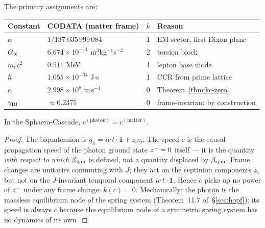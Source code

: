\begin{theorem}\label{thm:k-values}
The primary assignments are:
\begin{center}
\renewcommand{\arraystretch}{1.3}
\begin{tabular}{llcl}
\toprule
Constant & CODATA (matter frame) & $k$ & Reason\\
\midrule
$\alpha$ & $1/137.035\,999\,084$ & 1
 & EM sector, first Dixon plane\\
$G_N$ & $6.674\times10^{-11}$ m$^3$kg$^{-1}$s$^{-2}$ & 2
 & torsion block\\
$m_e c^2$ & $0.511$ MeV & 1
 & lepton base mode\\
$\hbar$ & $1.055\times10^{-34}$ J$\cdot$s & 1
 & CCR from prime lattice\\
$c$ & $2.998\times10^8$ m\,s$^{-1}$ & 0
 & Theorem~\ref{thm:kc-zero}\\
$\gamma_{\mathrm{BI}}$ & $\approx 0.2375$ & 0
 & frame-invariant by construction\\
\bottomrule
\end{tabular}
\end{center}
\end{theorem}


\begin{theorem}[$k(c)=0$: the speed of light is frame-invariant]
\label{thm:kc-zero}
In the Sphaera-Cascade, $c^{(\mathrm{photon})}=c^{(\mathrm{matter})}$.
\end{theorem}

\begin{proof}
The biquaternion is $q_n = ic\,t\cdot\mathbf{1}+z_i e_i$.
The speed $c$ is the causal propagation speed of the photon ground state
$z^-=0$ itself --- it is the quantity \emph{with respect to which}
$\beta_{\mathrm{sym}}$ is defined, not a quantity displaced by $\beta_{\mathrm{sym}}$.
Frame changes are unitaries commuting with $J$; they act on the septinion
components $z_i$ but not on the $J$-invariant temporal component
$ic\,t\cdot\mathbf{1}$.
Hence $c$ picks up no power of $z^-$ under any frame change:
$k(c)=0$.
Mechanically: the photon is the massless equilibrium node of the
spring system (Theorem~11.7 of~\S\ref{sec:hopf}); its speed is always $c$ because
the equilibrium node of a symmetric spring system has no dynamics of its own.
\end{proof}

